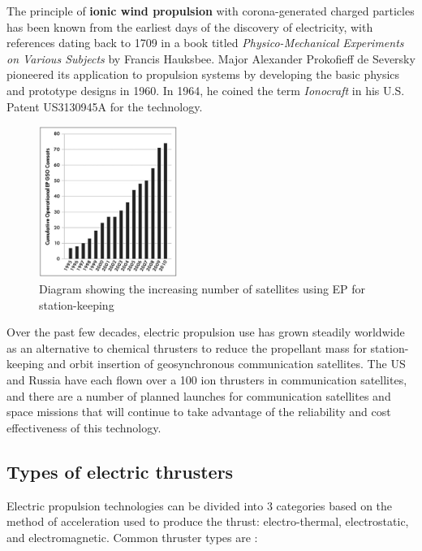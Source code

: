 \documentclass[11pt]{article}
\begin{document}
The principle of \textbf{ionic wind propulsion} with corona-generated charged particles has been known from the earliest days of the discovery of electricity, with references dating back to 1709 in a book titled \textit{Physico-Mechanical Experiments on Various Subjects} by Francis Hauksbee. Major Alexander Prokofieff de Seversky pioneered its application to propulsion systems by developing the basic physics and prototype designs in 1960. In 1964, he coined the term \textit{Ionocraft} in his U.S. Patent US3130945A for the technology.\\

\begin{figure}[h!]
\centering
\includegraphics[width= 0.4\textwidth]{comsats}
\caption{\label{fig:comsats} Diagram showing the increasing number of satellites using EP for station-keeping \cite{comstat}}
\end{figure}

Over the past few decades, electric propulsion use has grown steadily worldwide as an alternative to chemical thrusters to reduce the propellant mass for station-keeping and orbit insertion of geosynchronous communication satellites. The US and Russia have each flown over a 100 ion thrusters in communication satellites, and there are a number of planned launches for communication satellites and space missions that will continue to take advantage of the reliability and cost effectiveness of this technology.

\pagebreak
\subsection{Types of electric thrusters}

Electric propulsion technologies can be divided into 3 categories based on the method of acceleration used to produce the thrust: electro-thermal, electrostatic, and electromagnetic. Common thruster types are \cite{goebel}:
\end{document}
